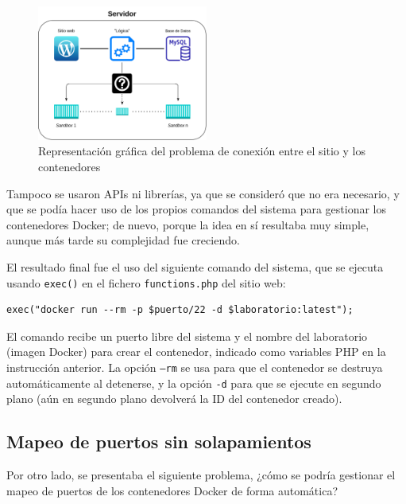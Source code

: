 \begin{appendices}
            \begin{figure}[htbp]
                \centering

                \includegraphics[width=0.5\textwidth]{images/Diagramas/conexion.png}
                \caption{Representación gráfica del problema de conexión entre el sitio y los contenedores}
                \label{fig:conexion}
            \end{figure}

            Tampoco se usaron APIs ni librerías, ya que se consideró que no era necesario, y que se podía hacer uso de los propios comandos del sistema para gestionar los contenedores Docker; de nuevo, porque la idea en sí resultaba muy simple, aunque más tarde su complejidad fue creciendo.

            El resultado final fue el uso del siguiente comando del sistema, que se ejecuta usando \texttt{exec()} en el fichero \texttt{functions.php} del sitio web:
            \\
            
            \begin{lstlisting}[style=php_style]
    exec("docker run --rm -p $puerto/22 -d $laboratorio:latest");
            \end{lstlisting}

            El comando recibe un puerto libre del sistema y el nombre del laboratorio (imagen Docker) para crear el contenedor, indicado como variables PHP en la instrucción anterior. La opción \texttt{--rm} se usa para que el contenedor se destruya automáticamente al detenerse, y la opción \texttt{-d} para que se ejecute en segundo plano (aún en segundo plano devolverá la ID del contenedor creado).


        \subsection{Mapeo de puertos sin solapamientos}

            Por otro lado, se presentaba el siguiente problema, ¿cómo se podría gestionar el mapeo de puertos de los contenedores Docker de forma automática?


\end{appendices}
